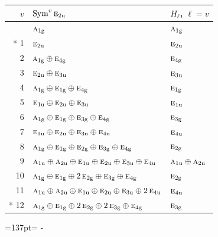 \documentclass[10pt,a4paper]{article}
\newcommand{\needspace}[1]{\par\penalty-100\begingroup\dimen0=#1\relax\dimen2=\pagegoal
  \advance\dimen2-\pagetotal\ifdim\dimen0>\dimen2\relax\ifdim\dimen2>0pt\vfil\break\fi\fi
  \endgroup}
\numberwithin{equation}{section}
\newcommand{\irr}[1]{\text{\normalfont\scshape #1}}
\newcommand{\ptag}[1]{\mathrm{#1}}
\begin{document}
{\small\begin{longtable}{@{}rll@{}}\toprule
$v$ & $\operatorname{Sym}^{v}\irr{e}_{2\ptag{u}}$ & $H_\ell$, $\ell = v$\\\midrule\endhead
\bottomrule\endfoot\endlastfoot
0 & $\irr{a}_{1\ptag{g}}$ & $\irr{a}_{1\ptag{g}}$\\*
1 & $\irr{e}_{2\ptag{u}}$ & $\irr{e}_{2\ptag{u}}$\\
2 & $\irr{a}_{1\ptag{g}} \oplus \irr{e}_{4\ptag{g}}$ & $\irr{e}_{4\ptag{g}}$\\
3 & $\irr{e}_{2\ptag{u}} \oplus \irr{e}_{3\ptag{u}}$ & $\irr{e}_{3\ptag{u}}$\\
4 & $\irr{a}_{1\ptag{g}} \oplus \irr{e}_{1\ptag{g}} \oplus \irr{e}_{4\ptag{g}}$ & $\irr{e}_{1\ptag{g}}$\\
5 & $\irr{e}_{1\ptag{u}} \oplus \irr{e}_{2\ptag{u}} \oplus \irr{e}_{3\ptag{u}}$ & $\irr{e}_{1\ptag{u}}$\\
6 & $\irr{a}_{1\ptag{g}} \oplus \irr{e}_{1\ptag{g}} \oplus \irr{e}_{3\ptag{g}} \oplus \irr{e}_{4\ptag{g}}$ & $\irr{e}_{3\ptag{g}}$\\
7 & $\irr{e}_{1\ptag{u}} \oplus \irr{e}_{2\ptag{u}} \oplus \irr{e}_{3\ptag{u}} \oplus \irr{e}_{4\ptag{u}}$ & $\irr{e}_{4\ptag{u}}$\\
8 & $\irr{a}_{1\ptag{g}} \oplus \irr{e}_{1\ptag{g}} \oplus \irr{e}_{2\ptag{g}} \oplus \irr{e}_{3\ptag{g}} \oplus \irr{e}_{4\ptag{g}}$ & $\irr{e}_{2\ptag{g}}$\\
9 & $\irr{a}_{1\ptag{u}} \oplus \irr{a}_{2\ptag{u}} \oplus \irr{e}_{1\ptag{u}} \oplus \irr{e}_{2\ptag{u}} \oplus \irr{e}_{3\ptag{u}} \oplus \irr{e}_{4\ptag{u}}$ & $\irr{a}_{1\ptag{u}} \oplus \irr{a}_{2\ptag{u}}$\\
10 & $\irr{a}_{1\ptag{g}} \oplus \irr{e}_{1\ptag{g}} \oplus 2\,\irr{e}_{2\ptag{g}} \oplus \irr{e}_{3\ptag{g}} \oplus \irr{e}_{4\ptag{g}}$ & $\irr{e}_{2\ptag{g}}$\\
11 & $\irr{a}_{1\ptag{u}} \oplus \irr{a}_{2\ptag{u}} \oplus \irr{e}_{1\ptag{u}} \oplus \irr{e}_{2\ptag{u}} \oplus \irr{e}_{3\ptag{u}} \oplus 2\,\irr{e}_{4\ptag{u}}$ & $\irr{e}_{4\ptag{u}}$\\*
12 & $\irr{a}_{1\ptag{g}} \oplus \irr{e}_{1\ptag{g}} \oplus 2\,\irr{e}_{2\ptag{g}} \oplus 2\,\irr{e}_{3\ptag{g}} \oplus \irr{e}_{4\ptag{g}}$ & $\irr{e}_{3\ptag{g}}$\\
\bottomrule\end{longtable}}
\needspace{137pt}
\end{document}
